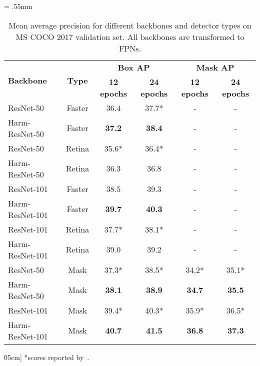 \documentclass[12pt,a4paper]{article}
\begin{document}
\begin{table}[t]
\caption{Mean average precision for different backbones and detector types on MS COCO 2017 validation set. All backbones are transformed to FPNs.} \label{tab:COCO}
\vspace{0.3\baselineskip}
\centering
\tabcolsep = .55mm
\begin{tabular}{ lccccc }
 \hline
 \multirow{2}{*}{\textbf{Backbone}} & \multirow{2}{*}{\textbf{Type}} & \multicolumn{2}{c}{\textbf{Box AP} } & \multicolumn{2}{c}{\textbf{Mask AP} } \\
 & & \textbf{12 epochs} & \textbf{24 epochs} & \textbf{12 epochs} & \textbf{24 epochs} \\
 \hline
 ResNet-50 & Faster & 36.4 & \hspace{.4ex} 37.7* & - & - \\
 Harm-ResNet-50 & Faster & \textbf{37.2} & \textbf{38.4} & - & - \\
 ResNet-50 & Retina & \hspace{.4ex} 35.6* & \hspace{.4ex} 36.4* & - & - \\
 Harm-ResNet-50 & Retina & 36.3 & 36.8 & - & - \\
 \hline
 ResNet-101 & Faster & 38.5 & 39.3 & - & - \\
 Harm-ResNet-101 & Faster & \textbf{39.7} & \textbf{40.3} & - & - \\
 ResNet-101 & Retina & \hspace{.4ex} 37.7* & \hspace{.4ex} 38.1* & - & - \\
 Harm-ResNet-101 & Retina & 39.0 & 39.2 & - & -\\
 \hline
 ResNet-50 & Mask & \hspace{.4ex} 37.3* & \hspace{.4ex} 38.5* & \hspace{.4ex} 34.2* & \hspace{.4ex} 35.1* \\
 Harm-ResNet-50 & Mask & \textbf{38.1} & \textbf{38.9} & \textbf{34.7} & \textbf{35.5} \\
 \hline
 ResNet-101 & Mask & \hspace{.4ex} 39.4* & \hspace{.4ex} 40.3* & \hspace{.4ex} 35.9* & \hspace{.4ex} 36.5* \\
 Harm-ResNet-101 & Mask & \textbf{40.7} & \textbf{41.5} & \textbf{36.8} & \textbf{37.3} \\
 \hline
\end{tabular}\.05cm]
*scores reported by~\cite{mmdet}.
\end{table}
\end{document}
